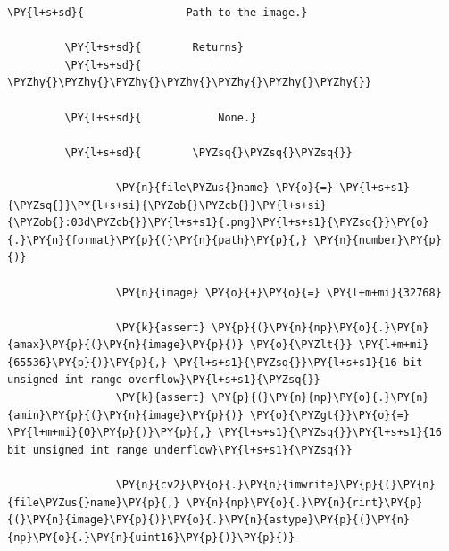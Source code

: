 \begin{Verbatim}[commandchars=\\\{\}]
         \PY{l+s+sd}{                Path to the image.}
         
         \PY{l+s+sd}{        Returns}
         \PY{l+s+sd}{        \PYZhy{}\PYZhy{}\PYZhy{}\PYZhy{}\PYZhy{}\PYZhy{}\PYZhy{}}
         
         \PY{l+s+sd}{            None.}
         
         \PY{l+s+sd}{        \PYZsq{}\PYZsq{}\PYZsq{}}
         
                 \PY{n}{file\PYZus{}name} \PY{o}{=} \PY{l+s+s1}{\PYZsq{}}\PY{l+s+si}{\PYZob{}\PYZcb{}}\PY{l+s+si}{\PYZob{}:03d\PYZcb{}}\PY{l+s+s1}{.png}\PY{l+s+s1}{\PYZsq{}}\PY{o}{.}\PY{n}{format}\PY{p}{(}\PY{n}{path}\PY{p}{,} \PY{n}{number}\PY{p}{)}
         
                 \PY{n}{image} \PY{o}{+}\PY{o}{=} \PY{l+m+mi}{32768}
                 
                 \PY{k}{assert} \PY{p}{(}\PY{n}{np}\PY{o}{.}\PY{n}{amax}\PY{p}{(}\PY{n}{image}\PY{p}{)} \PY{o}{\PYZlt{}} \PY{l+m+mi}{65536}\PY{p}{)}\PY{p}{,} \PY{l+s+s1}{\PYZsq{}}\PY{l+s+s1}{16 bit unsigned int range overflow}\PY{l+s+s1}{\PYZsq{}}
                 \PY{k}{assert} \PY{p}{(}\PY{n}{np}\PY{o}{.}\PY{n}{amin}\PY{p}{(}\PY{n}{image}\PY{p}{)} \PY{o}{\PYZgt{}}\PY{o}{=} \PY{l+m+mi}{0}\PY{p}{)}\PY{p}{,} \PY{l+s+s1}{\PYZsq{}}\PY{l+s+s1}{16 bit unsigned int range underflow}\PY{l+s+s1}{\PYZsq{}}
                 
                 \PY{n}{cv2}\PY{o}{.}\PY{n}{imwrite}\PY{p}{(}\PY{n}{file\PYZus{}name}\PY{p}{,} \PY{n}{np}\PY{o}{.}\PY{n}{rint}\PY{p}{(}\PY{n}{image}\PY{p}{)}\PY{o}{.}\PY{n}{astype}\PY{p}{(}\PY{n}{np}\PY{o}{.}\PY{n}{uint16}\PY{p}{)}\PY{p}{)}
\end{Verbatim}


